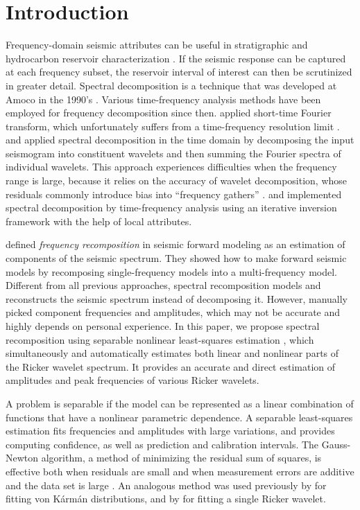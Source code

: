 \section{Introduction}
Frequency-domain seismic attributes can be useful in stratigraphic and hydrocarbon reservoir characterization \cite[]{Castagna,Li}. If the seismic response can be captured at each frequency subset, the reservoir interval of interest can then be scrutinized in greater detail. Spectral decomposition is a technique that was developed at Amoco in the 1990's \cite[]{Partyka}. Various time-frequency analysis methods have been employed for frequency decomposition since then. \cite{Dilay} applied short-time Fourier transform, which unfortunately suffers from a time-frequency resolution limit \cite[]{Chakraborty}. \cite{Liu} and \cite{Chen} applied spectral decomposition in the time domain by decomposing the input seismogram into constituent wavelets and then summing the Fourier spectra of individual wavelets. This approach experiences difficulties when the frequency range is large, because it relies on the accuracy of wavelet decomposition, whose residuals commonly introduce bias into ``frequency gathers'' \cite[]{Chen}. \cite{Fomel} and \cite{Liu} implemented spectral decomposition by time-frequency analysis using an iterative inversion framework with the help of local attributes.

\cite{Tomasso} defined \emph{frequency recomposition} in seismic forward modeling as an estimation of components of the seismic spectrum. They showed how to make forward seismic models by recomposing single-frequency models into a multi-frequency model. Different from all previous approaches, spectral recomposition models and reconstructs the seismic spectrum instead of decomposing it. However, \cite{Tomasso} manually picked component frequencies and amplitudes, which may not be accurate and highly depends on personal experience. In this paper, we propose spectral recomposition using separable nonlinear least-squares estimation \cite[]{Golub}, which simultaneously and automatically estimates both linear and nonlinear parts of the Ricker wavelet spectrum. It provides an accurate and direct estimation of amplitudes and peak frequencies of various Ricker wavelets. 

A problem is separable if the model can be represented as a linear combination of functions that have a nonlinear parametric dependence. A separable least-squares estimation fits frequencies and amplitudes with large variations, and provides computing confidence, as well as prediction and calibration intervals. The Gauss-Newton algorithm, a method of minimizing the residual sum of squares, is effective both when residuals are small and when measurement errors are additive and the data set is large \cite[]{Osborne}. An analogous method was used previously by \cite{Browaeys} for fitting von K\'{a}rm\'{a}n distributions, and by \cite{Liu2} for fitting a single Ricker wavelet.

